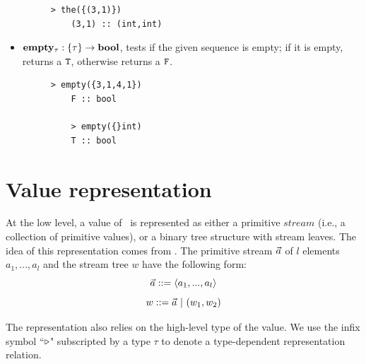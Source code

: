 \begin{itemize}
\begin{figure}[H]
\begin{lstlisting}[style = nesl-style]
	> the({(3,1)})
	(3,1) :: (int,int)
	\end{lstlisting}
	\end{figure}
	
	\item $\mathbf{empty_{\tau}:  \{\tau\} \rightarrow \mathbf{bool}}$, tests if the given sequence is empty; if it is empty, returns a $\mathtt{T}$, otherwise returns a $\mathtt{F}$.
	\begin{figure}[H]
	\begin{example}
	\end{example}
	\begin{lstlisting}[style = nesl-style]
	> empty({3,1,4,1})
	F :: bool
	
	> empty({}int)
	T :: bool
	\end{lstlisting}
	\end{figure}
\end{itemize}



\section{Value representation} \label{sec:valrep}
At the low level, a value of \mysnesl \ is represented as either a primitive $stream$ (i.e., a collection of primitive values),
or a binary tree structure with stream leaves. 
The idea of this representation comes from \cite{Blel90vecmod}. 
The primitive stream $\vec a$ of $l$ elements $a_1,...,a_l$ and the stream tree $w$ have the following form: 
$$ \a ::= \<a_1,...,a_l\'>$$
$$ w ::= \a \ | \ (w_1,w_2) $$

The representation also relies on the high-level type of the value. 
We use the infix symbol ``$ \triangleright$" subscripted by a type $\tau$ to denote a type-dependent representation relation.


